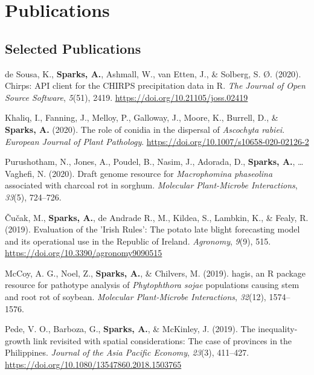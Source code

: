 \documentclass[11pt, a4paper]{awesome-cv}
\begin{document}
\hypertarget{publications}{%
\section{Publications}\label{publications}}

\hypertarget{selected-publications}{%
\subsection{Selected Publications}\label{selected-publications}}

\begingroup
\setlength{\parindent}{-0.5in}
\setlength{\leftskip}{0.5in}

\hypertarget{refs_articles}{}
\leavevmode\hypertarget{ref-deSousa2020}{}%
de Sousa, K., \textbf{Sparks, A.}, Ashmall, W., van Etten, J., \&
Solberg, S. Ø. (2020). Chirps: {API} client for the CHIRPS precipitation
data in {R}. \emph{The Journal of Open Source Software}, \emph{5}(51),
2419. \url{https://doi.org/10.21105/joss.02419}

\leavevmode\hypertarget{ref-khaliq_role_2020}{}%
Khaliq, I., Fanning, J., Melloy, P., Galloway, J., Moore, K., Burrell,
D., \& \textbf{Sparks, A.} (2020). The role of conidia in the dispersal
of \emph{{Ascochyta} rabiei}. \emph{European Journal of Plant
Pathology}. \url{https://doi.org/10.1007/s10658-020-02126-2}

\leavevmode\hypertarget{ref-Purushotham2020}{}%
Purushotham, N., Jones, A., Poudel, B., Nasim, J., Adorada, D.,
\textbf{Sparks, A.}, \ldots{} Vaghefi, N. (2020). Draft genome resource
for \emph{{Macrophomina} phaseolina} associated with charcoal rot in
sorghum. \emph{Molecular Plant-Microbe Interactions}, \emph{33}(5),
724--726.

\leavevmode\hypertarget{ref-cucak2019evaluation}{}%
Čučak, M., \textbf{Sparks, A.}, de Andrade R., M., Kildea, S., Lambkin,
K., \& Fealy, R. (2019). Evaluation of the {{'}Irish Rules{'}}: The
potato late blight forecasting model and its operational use in the
{Republic of Ireland}. \emph{Agronomy}, \emph{9}(9), 515.
\url{https://doi.org/10.3390/agronomy9090515}

\leavevmode\hypertarget{ref-McCoy2019}{}%
McCoy, A. G., Noel, Z., \textbf{Sparks, A.}, \& Chilvers, M. (2019).
{hagis}, an {R} package resource for pathotype analysis of
\emph{{Phytophthora} sojae} populations causing stem and root rot of
soybean. \emph{Molecular Plant-Microbe Interactions}, \emph{32}(12),
1574--1576.

\leavevmode\hypertarget{ref-Pede2019}{}%
Pede, V. O., Barboza, G., \textbf{Sparks, A.}, \& McKinley, J. (2019).
The inequality-growth link revisited with spatial considerations: The
case of provinces in the {Philippines}. \emph{Journal of the Asia
Pacific Economy}, \emph{23}(3), 411--427.
\url{https://doi.org/10.1080/13547860.2018.1503765}
\end{document}
